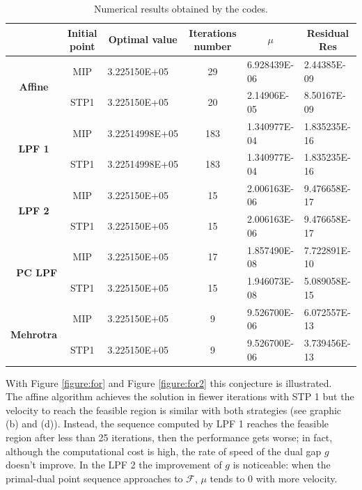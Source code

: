 \documentclass[a4paper,10 pt,titlepage,twoside]{report}
\theoremstyle{plain}
\theoremstyle{definition}
\theoremstyle{remark}
\begin{document}
{{\begin{table}[]\caption{\label{table:PNV}Numerical results obtained by the codes.}
	\begin{tabular}{cclcll}
		\hline		\textbf{} & \textbf{Initial point} & \multicolumn{1}{c}{\textbf{Optimal value}} & \textbf{Iterations number} & \multicolumn{1}{c}{\textbf{$\mu$}} & \multicolumn{1}{c}{\textbf{Residual} Res} \\ \hline
		\multicolumn{1}{c|}{\multirow{2}{*}{\textbf{Affine}}} & MIP & 3.225150E+05 & 29 & 6.928439E-06 & 2.44385E-09 \\
		\multicolumn{1}{c|}{} & STP1 & 3.225150E+05 & 20 & 2.14906E-05 & 8.50167E-09 \\ \hline
		\multicolumn{1}{c|}{\multirow{2}{*}{\textbf{LPF 1}}} & MIP & 3.22514998E+05 & 183 & 1.340977E-04 & 1.835235E-16 \\
		\multicolumn{1}{c|}{} & STP1 & 3.22514998E+05 & 183 & 1.340977E-04 & 1.835235E-16 \\ \hline
		\multicolumn{1}{c|}{\multirow{2}{*}{\textbf{LPF 2}}} & MIP & 3.225150E+05 & 15 & 2.006163E-06 & 9.476658E-17 \\
		\multicolumn{1}{c|}{} & STP1 & 3.225150E+05 & 15 & 2.006163E-06 & 9.476658E-17 \\ \hline
		\multicolumn{1}{r|}{\multirow{2}{*}{\textbf{PC LPF}}} & MIP & 3.225150E+05 & 17 & 1.857490E-08 & 7.722891E-10 \\
		\multicolumn{1}{r|}{} & STP1 & 3.225150E+05 & 15 & 1.946073E-08 & 5.089058E-15 \\ \hline
		\multicolumn{1}{c|}{\multirow{2}{*}{\textbf{Mehrotra}}} & MIP & 3.225150E+05 & 9 & 9.526700E-06 & 6.072557E-13 \\
		\multicolumn{1}{c|}{} & STP1 & 3.225150E+05 & 9 & 9.526700E-06 & 3.739456E-13 \\ \hline
	\end{tabular}
\end{table}
With Figure \ref{figure:for} and Figure \ref{figure:for2} this conjecture is illustrated.\\ 
The affine algorithm achieves the solution in fiewer iterations with STP 1 but the velocity to reach the feasible region is similar with both strategies (see graphic (b) and (d)). Instead, the sequence computed by LPF 1 reaches the feasible region after less than 25 iterations, then the performance gets worse;  in fact, although the computational cost is high, the rate of speed of the dual gap $g$ doesn't improve.  
In the LPF 2 the improvement of $g$ is noticeable: when the primal-dual point sequence approaches to $\mathcal{F}$, $\mu$ tends to 0 with more velocity.\\ 
}}
\end{document}
